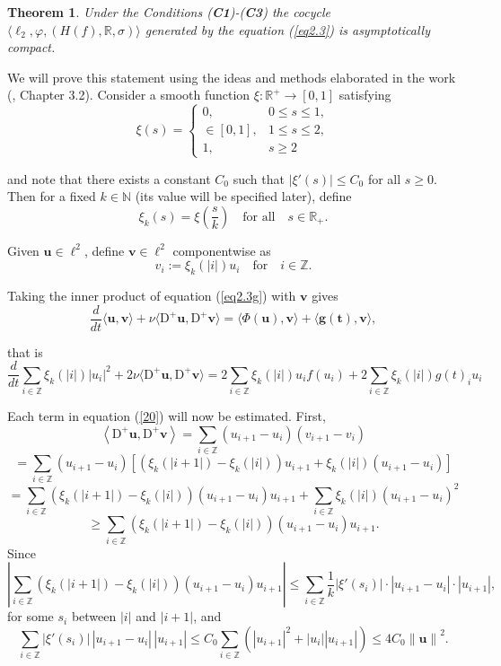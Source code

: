 \documentclass{amsart}%
\newtheorem{theorem}[lemma]{Theorem}
\begin{document}
\begin{theorem}\label{thAC1} Under the Conditions
(\textbf{C1})-(\textbf{C3}) the cocycle $\langle
\ell_{2},\varphi,(H(f),\mathbb R,\sigma)\rangle$ generated by the
equation (\ref{eq2.3}) is asymptotically compact.
\end{theorem}
{\color{violet}
We will prove this statement using the ideas and methods elaborated in the work (\cite{HK_2023}, Chapter 3.2).
Consider a smooth function \( \xi : \mathbb{R}^+ \to [0, 1] \) satisfying
\[
\xi(s) =
\begin{cases}
0, & 0 \le s \le 1, \\
\in [0, 1], & 1 \le s \le 2, \\
1, & s \ge 2
\end{cases}
\]

and note that there exists a constant \( C_0 \) such that \( |\xi'(s)| \le C_0 \) for all \( s \ge 0 \).
Then for a fixed \( k \in \mathbb{N} \) (its value will be specified later), define
\[
\xi_k(s) = \xi \left( \frac{s}{k} \right) \quad \text{for all} \quad s \in \mathbb{R_+}.
\]

Given \( \mathbf{u} \in \ell^2 \), define \( \mathbf{v} \in \ell^2 \) componentwise as
\[
v_i := \xi_k( |i| ) u_i \quad \text{for} \quad i \in \mathbb{Z}.
\]

Taking the inner product of equation (\ref{eq2.3g}) with \( \mathbf{v} \) gives
\[
\frac{d}{dt} \langle \mathbf{u}, \mathbf{v} \rangle + \nu \langle \mathrm{D}^+ \mathbf{u}, \mathrm{D}^+ \mathbf{v} \rangle = \langle \Phi(\mathbf{u}), \mathbf{v} \rangle + \langle \mathbf{g(t)}, \mathbf{v} \rangle,
\]

that is
\begin{equation}\label{20}
\frac{d}{dt} \sum_{i \in \mathbb{Z}} \xi_k( |i| ) |u_i|^2 + 2 \nu \langle \mathrm{D}^+ \mathbf{u}, \mathrm{D}^+ \mathbf{v} \rangle = 2 \sum_{i \in \mathbb{Z}} \xi_k( |i| ) u_i f(u_i) + 2 \sum_{i \in \mathbb{Z}} \xi_k( |i| ) g(t)_i u_i
\end{equation}

Each term in equation (\ref{20}) will now be estimated. First,
\[
\left\langle \mathrm{D}^+ \mathbf{u}, \mathrm{D}^+ \mathbf{v} \right\rangle = \sum_{i \in \mathbb{Z}} (u_{i+1} - u_i)(v_{i+1} - v_i)
\]
\[
= \sum_{i \in \mathbb{Z}} (u_{i+1} - u_i) \left[ \left( \xi_k(|i+1|) - \xi_k(|i|) \right) u_{i+1} + \xi_k(|i|)(u_{i+1} - u_i) \right]
\]
\[
= \sum_{i \in \mathbb{Z}} \left( \xi_k(|i+1|) - \xi_k(|i|) \right) (u_{i+1} - u_i) u_{i+1} + \sum_{i \in \mathbb{Z}} \xi_k(|i|) (u_{i+1} - u_i)^2
\]
\[
\ge \sum_{i \in \mathbb{Z}} \left( \xi_k(|i+1|) - \xi_k(|i|) \right) (u_{i+1} - u_i) u_{i+1}.
\]
Since
\[
\left| \sum_{i \in \mathbb{Z}} \left( \xi_k(|i+1|) - \xi_k(|i|) \right) (u_{i+1} - u_i) u_{i+1} \right| 
\le \sum_{i \in \mathbb{Z}} \frac{1}{k} |\xi'(s_i)| \cdot |u_{i+1} - u_i| \cdot |u_{i+1}|,
\]
for some \( s_i \) between \( |i| \) and \( |i+1| \), and
\[
\sum_{i \in \mathbb{Z}} |\xi'(s_i)| \, |u_{i+1} - u_i| \, |u_{i+1}| 
\le C_0 \sum_{i \in \mathbb{Z}} \left( |u_{i+1}|^2 + |u_i||u_{i+1}| \right) \le 4 C_0 \left\| \mathbf{u} \right\|^2.
\]

}
\end{document}
